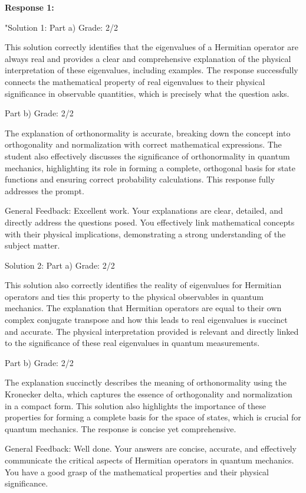 \documentclass[a4paper,11pt]{article}
\begin{document}
\textbf{Response 1:}

"Solution 1:
Part a)
Grade: 2/2

This solution correctly identifies that the eigenvalues of a Hermitian operator are always real and provides a clear and comprehensive explanation of the physical interpretation of these eigenvalues, including examples. The response successfully connects the mathematical property of real eigenvalues to their physical significance in observable quantities, which is precisely what the question asks.

Part b)
Grade: 2/2

The explanation of orthonormality is accurate, breaking down the concept into orthogonality and normalization with correct mathematical expressions. The student also effectively discusses the significance of orthonormality in quantum mechanics, highlighting its role in forming a complete, orthogonal basis for state functions and ensuring correct probability calculations. This response fully addresses the prompt.

General Feedback:
Excellent work. Your explanations are clear, detailed, and directly address the questions posed. You effectively link mathematical concepts with their physical implications, demonstrating a strong understanding of the subject matter.

Solution 2:
Part a)
Grade: 2/2

This solution also correctly identifies the reality of eigenvalues for Hermitian operators and ties this property to the physical observables in quantum mechanics. The explanation that Hermitian operators are equal to their own complex conjugate transpose and how this leads to real eigenvalues is succinct and accurate. The physical interpretation provided is relevant and directly linked to the significance of these real eigenvalues in quantum measurements.

Part b)
Grade: 2/2

The explanation succinctly describes the meaning of orthonormality using the Kronecker delta, which captures the essence of orthogonality and normalization in a compact form. This solution also highlights the importance of these properties for forming a complete basis for the space of states, which is crucial for quantum mechanics. The response is concise yet comprehensive.

General Feedback:
Well done. Your answers are concise, accurate, and effectively communicate the critical aspects of Hermitian operators in quantum mechanics. You have a good grasp of the mathematical properties and their physical significance.
\end{document}
